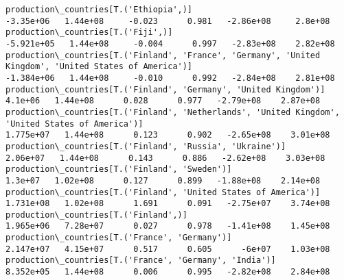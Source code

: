 \documentclass[11pt]{article}
\begin{document}
\begin{Verbatim}[commandchars=\\\{\}]
production\_countries[T.('Ethiopia',)]                                                                                                                                                  -3.35e+06   1.44e+08     -0.023      0.981   -2.86e+08     2.8e+08
production\_countries[T.('Fiji',)]                                                                                                                                                     -5.921e+05   1.44e+08     -0.004      0.997   -2.83e+08    2.82e+08
production\_countries[T.('Finland', 'France', 'Germany', 'United Kingdom', 'United States of America')]                                                                                -1.384e+06   1.44e+08     -0.010      0.992   -2.84e+08    2.81e+08
production\_countries[T.('Finland', 'Germany', 'United Kingdom')]                                                                                                                         4.1e+06   1.44e+08      0.028      0.977   -2.79e+08    2.87e+08
production\_countries[T.('Finland', 'Netherlands', 'United Kingdom', 'United States of America')]                                                                                       1.775e+07   1.44e+08      0.123      0.902   -2.65e+08    3.01e+08
production\_countries[T.('Finland', 'Russia', 'Ukraine')]                                                                                                                                2.06e+07   1.44e+08      0.143      0.886   -2.62e+08    3.03e+08
production\_countries[T.('Finland', 'Sweden')]                                                                                                                                            1.3e+07   1.02e+08      0.127      0.899   -1.88e+08    2.14e+08
production\_countries[T.('Finland', 'United States of America')]                                                                                                                        1.731e+08   1.02e+08      1.691      0.091   -2.75e+07    3.74e+08
production\_countries[T.('Finland',)]                                                                                                                                                   1.965e+06   7.28e+07      0.027      0.978   -1.41e+08    1.45e+08
production\_countries[T.('France', 'Germany')]                                                                                                                                          2.147e+07   4.15e+07      0.517      0.605      -6e+07    1.03e+08
production\_countries[T.('France', 'Germany', 'India')]                                                                                                                                 8.352e+05   1.44e+08      0.006      0.995   -2.82e+08    2.84e+08

\end{Verbatim}
\end{document}
